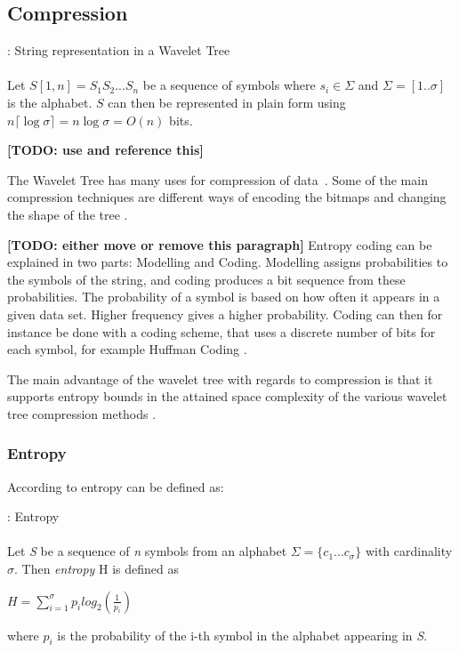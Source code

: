 \subsection{Compression}
\vspace{0.5 cm}
\begin{mdframed}[nobreak, linecolor=lightgray, linewidth=2pt]
\begin{definition}: String representation in a Wavelet Tree\\\\
Let $S[1,n] = S_1 S_2 ... S_n$ be a sequence of symbols where $s_i \in \Sigma$ and $\Sigma = [1 .. \sigma]$ is the alphabet. $S$ can then be represented in plain form using $n \lceil \log \sigma \rceil = n \log \sigma = O(n)$ bits.
\end{definition}
\textbf{[TODO: use and reference this]}
\end{mdframed}
\vspace{0.5 cm}
The Wavelet Tree has many uses for compression of data~\citep{Navjda13}. Some of the main compression techniques are different ways of encoding the bitmaps and changing the shape of the tree \citep[Section~3]{Navjda13}.

\textbf{[TODO: either move or remove this paragraph]}
Entropy coding can be explained in two parts: Modelling and Coding.
Modelling assigns probabilities to the symbols of the string, and coding produces a bit sequence from these probabilities.
The probability of a symbol is based on how often it appears in a given data set. 
Higher frequency gives a higher probability.
Coding can then for instance be done with a coding scheme, that uses a discrete number of bits for each symbol, for example Huffman Coding \citep{HuffmanCoding}.

The main advantage of the wavelet tree with regards to compression is that it supports entropy bounds in the attained space complexity of the various wavelet tree compression methods \citep[Section~2.1]{WTSurvey}.

\subsubsection{Entropy}
According to \citep[Introduction]{WTSurvey} entropy can be defined as:

\begin{mdframed}[nobreak, linecolor=lightgray, linewidth=2pt]
\begin{definition}: Entropy \\\\
Let \textit{S} be a sequence of \textit{n} symbols from an alphabet $\Sigma = \lbrace c_1 ... c_\sigma \rbrace$ with cardinality $\sigma$.
Then \textit{entropy} H is defined as
\begin{center}
$H = \sum_{i=1}^{\sigma} p_i log_2(\frac{1}{p_i})$
\end{center}
where $p_i$ is the probability of the i-th symbol in the alphabet appearing in \textit{S}.
\end{definition} 
\end{mdframed}

